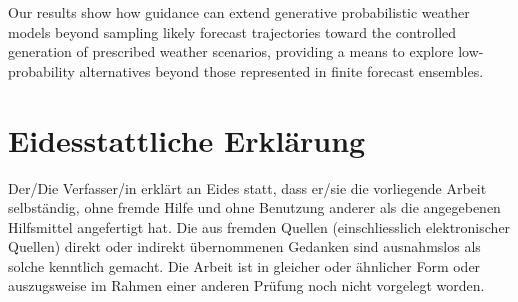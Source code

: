 \documentclass[12pt,a4paper,english,oneside]{book}
\begin{document}
Our results show how guidance can extend generative probabilistic weather
models beyond sampling likely forecast trajectories toward the controlled
generation of prescribed weather scenarios, providing a means to explore
low-probability alternatives beyond those represented in finite forecast
ensembles.


\thispagestyle{firststyle}

\tableofcontents
\listoffigures
\listoftables
\newpage
{}


% 

% 
% 


% 







\newpage

\appendix
\noappendicestocpagenum
\addappheadtotoc
\appendixpage

\renewcommand{\theequation}{A.\arabic{equation}}



\printbibliography

\newpage
\thispagestyle{firststyle}
\section*{Eidesstattliche Erklärung}
Der/Die Verfasser/in erklärt an Eides statt, dass er/sie die vorliegende Arbeit selbständig, ohne fremde Hilfe und ohne Benutzung anderer als die angegebenen Hilfsmittel angefertigt hat. Die aus fremden Quellen (einschliesslich elektronischer Quellen) direkt oder indirekt übernommenen Gedanken sind ausnahmslos als solche kenntlich gemacht. Die Arbeit ist in gleicher oder ähnlicher Form oder auszugsweise im Rahmen einer anderen Prüfung noch nicht vorgelegt worden.\\[2cm]
 \hfill {}
\end{document}
